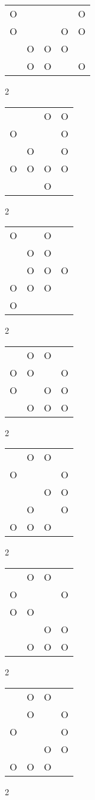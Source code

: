 \begin{tabular}{|m{0.2cm}m{0.2cm}m{0.2cm}m{0.2cm}m{0.2cm}|}\hline
O& & & &O\\
O& & &O&O\\
 &O&O&O& \\
 &O&O& &O\\
\hline\end{tabular}2
\begin{tabular}{|m{0.2cm}m{0.2cm}m{0.2cm}m{0.2cm}|}\hline
 & &O&O\\
O& & &O\\
 &O& &O\\
O&O&O&O\\
 & &O& \\
\hline\end{tabular}2
\begin{tabular}{|m{0.2cm}m{0.2cm}m{0.2cm}m{0.2cm}|}\hline
O& &O& \\
 &O&O& \\
 &O&O&O\\
O&O&O& \\
O& & & \\
\hline\end{tabular}2
\begin{tabular}{|m{0.2cm}m{0.2cm}m{0.2cm}m{0.2cm}|}\hline
 &O&O& \\
O&O& &O\\
O& &O&O\\
 &O&O&O\\
\hline\end{tabular}2
\begin{tabular}{|m{0.2cm}m{0.2cm}m{0.2cm}m{0.2cm}|}\hline
 &O&O& \\
O& & &O\\
 & &O&O\\
 &O& &O\\
O&O&O& \\
\hline\end{tabular}2
\begin{tabular}{|m{0.2cm}m{0.2cm}m{0.2cm}m{0.2cm}|}\hline
 &O&O& \\
O& & &O\\
O&O& & \\
 & &O&O\\
 &O&O&O\\
\hline\end{tabular}2
\begin{tabular}{|m{0.2cm}m{0.2cm}m{0.2cm}m{0.2cm}|}\hline
 &O&O& \\
 &O& &O\\
O& & &O\\
 & &O&O\\
O&O&O& \\
\hline\end{tabular}2
